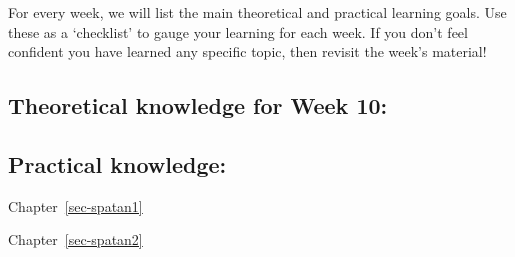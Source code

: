 \documentclass[
  letterpaper,
  DIV=11,
  numbers=noendperiod]{scrreprt}
\begin{document}
For every week, we will list the main theoretical and practical learning
goals. Use these as a `checklist' to gauge your learning for each week.
If you don't feel confident you have learned any specific topic, then
revisit the week's material!

\subsection*{Theoretical knowledge for Week
10:}\label{theoretical-knowledge-for-week-10}

\subsection*{Practical knowledge:}\label{practical-knowledge-7}

Chapter~\ref{sec-spatan1}

Chapter~\ref{sec-spatan2}
\end{document}
